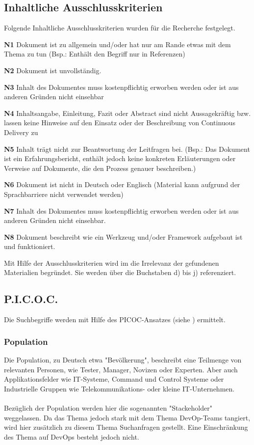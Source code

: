 \subsection{Inhaltliche Ausschlusskriterien}
\label{subsec:inhaltlicheAusschlusskriterien}
Folgende Inhaltliche Ausschlusskriterien wurden für die Recherche festgelegt.
\begin{list}{label}{spacing}
	\item[\textbf{N1}] Dokument ist zu allgemein und/oder hat nur am Rande etwas mit dem Thema zu tun (Bsp.: Enthält den Begriff nur in Referenzen)
	\item[\textbf{N2}] Dokument ist unvollständig.
	\item[\textbf{N3}] Inhalt des Dokumentes muss kostenpflichtig erworben werden oder ist aus anderen Gründen nicht einsehbar
	\item[\textbf{N4}] Inhaltsangabe, Einleitung, Fazit oder Abstract sind nicht Aussagekräftig bzw. lassen keine Hinweise auf den Einsatz oder der Beschreibung von Continuous Delivery zu
	\item[\textbf{N5}] Inhalt trägt nicht zur Beantwortung der Leitfragen bei. (Bsp.: Das Dokument ist ein Erfahrungsbericht, enthält jedoch keine konkreten Erläuterungen oder Verweise auf Dokumente, die den Prozess genauer beschreiben.)
	\item[\textbf{N6}] Dokument ist nicht in Deutsch oder Englisch (Material kann aufgrund der Sprachbarriere nicht verwendet werden)
	\item[\textbf{N7}] Inhalt des Dokumentes muss kostenpflichtig erworben werden oder ist aus anderen Gründen nicht einsehbar.
	\item[\textbf{N8}] Dokument beschreibt wie ein Werkzeug und/oder Framework aufgebaut ist und funktioniert.
\end{list}
Mit Hilfe der Ausschlusskriterien wird im  die Irrelevanz der gefundenen Materialien begründet. Sie werden über die Buchstaben d) bis j) referenziert.

\subsection{P.I.C.O.C.}
\label{subsec:picoc}
Die Suchbegriffe werden mit Hilfe des PICOC-Ansatzes (siehe \cite{Kitchenham2007}) ermittelt.

\subsubsection*{Population}
\label{picoc:population}
Die Population, zu Deutsch etwa "Bevölkerung", beschreibt eine Teilmenge von relevanten Personen, wie Tester, Manager, Novizen oder Experten. Aber auch Applikationsfelder wie IT-Systeme, Command und Control Systeme oder Industrielle Gruppen wie Telekommunikations- oder kleine IT-Unternehmen.
\\\\
Bezüglich der Population werden hier die sogenannten "Stackeholder" weggelassen. Da das Thema jedoch stark mit dem Thema DevOp-Teams tangiert, wird hier zusätzlich zu diesem Thema Suchanfragen gestellt. Eine Einschränkung des Thema auf DevOps besteht jedoch nicht.

